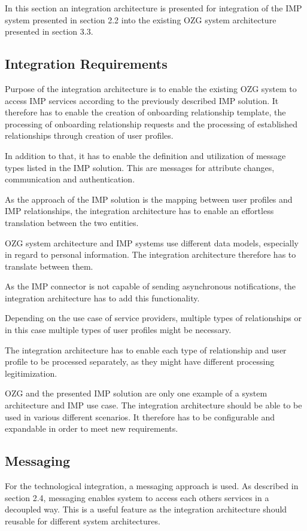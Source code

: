 In this section an integration architecture is presented for integration of the IMP system presented in section 2.2 into the existing OZG system architecture presented in section 3.3. 

\subsection{Integration Requirements}
Purpose of the integration architecture is to enable the existing OZG system to access IMP services according to the previously described IMP solution. It therefore has to enable the creation of onboarding relationship template, the processing of onboarding relationship requests and the processing of established relationships through creation of user profiles.

In addition to that, it has to enable the definition and utilization of message types listed in the IMP solution. This are messages for attribute changes, communication and authentication.

As the approach of the IMP solution is the mapping between user profiles and IMP relationships, the integration architecture has to enable an effortless translation between the two entities.

OZG system architecture and IMP systems use different data models, especially in regard to personal information. The integration architecture therefore has to translate between them.

As the IMP connector is not capable of sending asynchronous notifications, the integration architecture has to add this functionality.

Depending on the use case of service providers, multiple types of relationships or in this case multiple types of user profiles might be necessary.

The integration architecture has to enable each type of relationship and user profile to be processed separately, as they might have different processing legitimization.

OZG and the presented IMP solution are only one example of a system architecture and IMP use case. The integration architecture should be able to be used in various different scenarios. It therefore has to be configurable and expandable in order to meet new requirements.

\subsection{Messaging}
For the technological integration, a messaging approach is used. As described in section 2.4, messaging enables system to access each others services in a decoupled way. This is a useful feature as the integration architecture should reusable for different system architectures.

